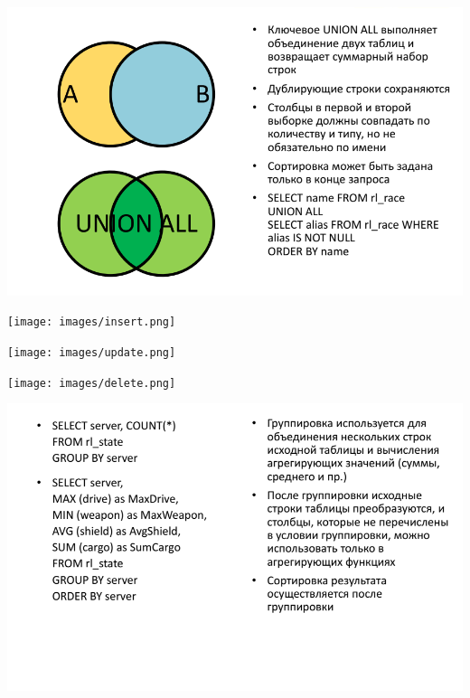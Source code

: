 \documentclass{beamer}
\begin{document}
\begin{frame}
\begin{center}
\includegraphics[scale=0.5]{images/union.png}
\end{center}
\end{frame} 

\begin{frame}
\begin{center}
\texttt{[image: images/insert.png]}
\end{center}
\end{frame} 

\begin{frame}
\begin{center}
\texttt{[image: images/update.png]}
\end{center}
\end{frame} 

\begin{frame}
\begin{center}
\texttt{[image: images/delete.png]}
\end{center}
\end{frame} 

\begin{frame}
\begin{center}
\includegraphics[scale=0.5]{images/group.png}
\end{center}
\end{frame} 
\end{document}

